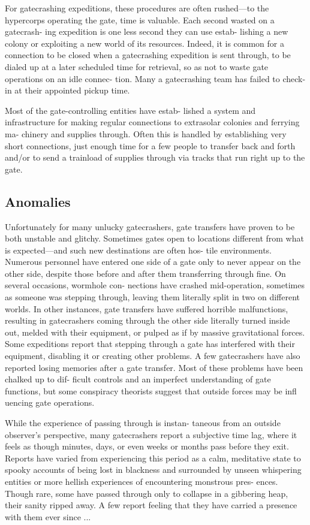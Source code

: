 For gatecrashing expeditions, these procedures are 
often rushed—to the hypercorps operating the gate, 
time is valuable. Each second wasted on a gatecrash-
ing expedition is one less second they can use estab-
lishing a new colony or exploiting a new world of its 
resources. Indeed, it is common for a connection to be 
closed when a gatecrashing expedition is sent through, 
to be dialed up at a later scheduled time for retrieval, 
so as not to waste gate operations on an idle connec-
tion. Many a gatecrashing team has failed to check-in 
at their appointed pickup time.

Most of the gate-controlling entities have estab-
lished a system and infrastructure for making regular 
connections to extrasolar colonies and ferrying ma-
chinery and supplies through. Often this is handled by 
establishing very short connections, just enough time 
for a few people to transfer back and forth and/or to 
send a trainload of supplies through via tracks that 
run right up to the gate.

\subsection{Anomalies}

Unfortunately for many unlucky gatecrashers, gate 
transfers have proven to be both unstable and glitchy. 
Sometimes gates open to locations different from what 
is expected—and such new destinations are often hos-
tile environments. Numerous personnel have entered 
one side of a gate only to never appear on the other 
side, despite those before and after them transferring 
through fine. On several occasions, wormhole con-
nections have crashed mid-operation, sometimes as 
someone was stepping through, leaving them literally 
split in two on different worlds. In other instances, 
gate transfers have suffered horrible malfunctions, 
resulting in gatecrashers coming through the other 
side literally turned inside out, melded with their 
equipment, or pulped as if by massive gravitational 
forces. Some expeditions report that stepping through 
a gate has interfered with their equipment, disabling 
it or creating other problems. A few gatecrashers have 
also reported losing memories after a gate transfer. 
Most of these problems have been chalked up to dif-
ficult controls and an imperfect understanding of gate 
functions, but some conspiracy theorists suggest that 
outside forces may be infl uencing gate operations. 

While the experience of passing through is instan-
taneous from an outside observer's perspective, many 
gatecrashers report a subjective time lag, where it feels 
as though minutes, days, or even weeks or months 
pass before they exit. Reports have varied from 
experiencing this period as a calm, meditative state 
to spooky accounts of being lost in blackness and 
surrounded by unseen whispering entities or more 
hellish experiences of encountering monstrous pres-
ences. Though rare, some have passed through only to 
collapse in a gibbering heap, their sanity ripped away. 
A few report feeling that they have carried a presence 
with them ever since ...

